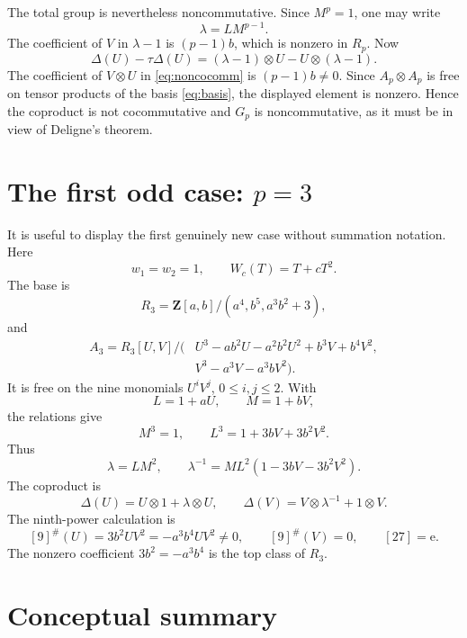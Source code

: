 \documentclass[11pt]{amsart}
\theoremstyle{definition}
\theoremstyle{remark}
\newcommand{\Z}{\mathbf Z}
\newcommand{\ot}{\otimes}
\newcommand{\unit}{\mathrm e}
\begin{document}
The total group is nevertheless noncommutative.  Since \(M^p=1\), one
may write
\[
 \lambda=LM^{p-1}.
\]
The coefficient of \(V\) in \(\lambda-1\) is
\((p-1)b\), which is nonzero in \(R_p\).  Now
\begin{equation}\label{eq:noncocomm}
 \Delta(U)-\tau\Delta(U)
 =(\lambda-1)\ot U-U\ot(\lambda-1).
\end{equation}
The coefficient of \(V\ot U\) in \eqref{eq:noncocomm} is
\((p-1)b\ne0\).  Since \(A_p\ot A_p\) is free on tensor products of
the basis \eqref{eq:basis}, the displayed element is nonzero.  Hence the
coproduct is not cocommutative and \(G_p\) is noncommutative, as it must
be in view of Deligne's theorem.

\section{The first odd case: \texorpdfstring{\(p=3\)}{p=3}}

It is useful to display the first genuinely new case without summation
notation.  Here
\[
 w_1=w_2=1,
 \qquad W_c(T)=T+cT^2.
\]
The base is
\begin{equation}\label{eq:p3-base}
 R_3=\Z[a,b]/(a^4,b^5,a^3b^2+3),
\end{equation}
and
\begin{equation}\label{eq:p3-A}
 \begin{split}
 A_3=R_3[U,V]/(&U^3-ab^2U-a^2b^2U^2+b^3V+b^4V^2,\\
               &V^3-a^3V-a^3bV^2).
 \end{split}
\end{equation}
It is free on the nine monomials \(U^iV^j\), \(0\leq i,j\leq2\).
With
\[
 L=1+aU,\qquad M=1+bV,
\]
the relations give
\[
 M^3=1,
 \qquad L^3=1+3bV+3b^2V^2.
\]
Thus
\[
 \lambda=LM^2,
 \qquad
 \lambda^{-1}=ML^2(1-3bV-3b^2V^2).
\]
The coproduct is
\[
 \Delta(U)=U\ot1+\lambda\ot U,
 \qquad
 \Delta(V)=V\ot\lambda^{-1}+1\ot V.
\]
The ninth-power calculation is
\begin{equation}\label{eq:p3-power}
 [9]^\#(U)=3b^2UV^2=-a^3b^4UV^2\ne0,
 \qquad [9]^\#(V)=0,
 \qquad [27]=\unit.
\end{equation}
The nonzero coefficient \(3b^2=-a^3b^4\) is the top class of
\(R_3\).

\section{Conceptual summary}
\end{document}

